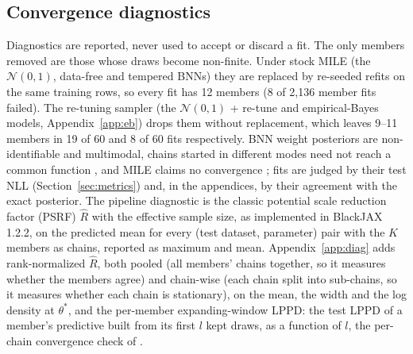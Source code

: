 \documentclass[11pt]{article}
\newcommand{\nzo}{\mathcal{N}(0,1)}
\begin{document}
\subsection{Convergence diagnostics}
\label{sec:convdiag}
Diagnostics are reported, never used to accept or discard a fit. The only members removed are those whose draws
become non-finite. Under stock MILE (the $\nzo$, data-free and tempered BNNs) they are replaced by re-seeded refits on
the same training rows, so every fit has 12 members (8 of 2{,}136 member fits failed). The re-tuning sampler (the
$\nzo$ + re-tune and empirical-Bayes models, Appendix~\ref{app:eb}) drops them without replacement, which leaves 9--11
members in 19 of 60 and 8 of 60 fits respectively.
BNN weight posteriors are non-identifiable and multimodal, chains started in different modes need not reach a common
function \citep[Sec.~6.2]{sommer2024connecting}, and MILE claims no convergence \citep[App.~A.3]{sommer2025mile}; fits are judged
by their test NLL (Section~\ref{sec:metrics}) and, in the appendices, by their agreement with the exact posterior. The pipeline diagnostic is the classic potential scale reduction
factor (PSRF) $\widehat R$ \citep{gelman1992inference} with the effective sample size, as implemented in BlackJAX 1.2.2, on the
predicted mean for every (test dataset, parameter) pair with the $K$ members as chains, reported as maximum and mean.
Appendix~\ref{app:diag} adds rank-normalized $\widehat R$, both pooled (all members' chains together, so it measures
whether the members agree) and chain-wise (each chain split into sub-chains, so it measures whether each chain is
stationary), on the mean, the width and the log density
at $\theta^\ast$, and the per-member expanding-window LPPD: the test LPPD of a member's predictive built from its first
$l$ kept draws, as a function of $l$, the per-chain convergence check of \citet[App.~B.2]{sommer2024connecting}.
\end{document}
